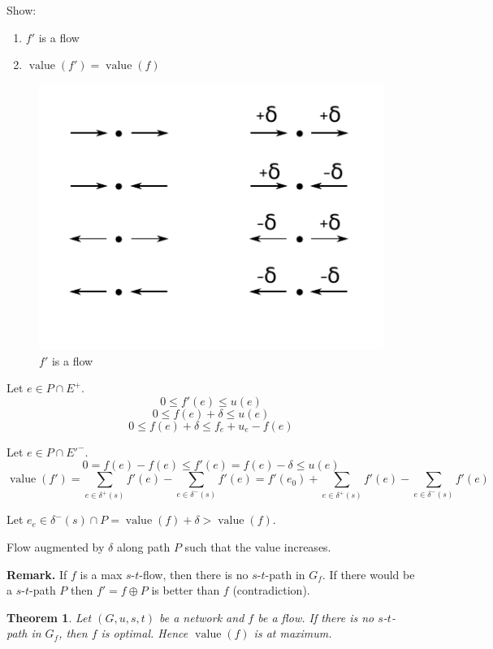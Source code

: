 \documentclass{article}
\newtheorem{theorem}{Theorem}
\newcommand{\gath}[2]{$#1$-$#2$-path} %
\newcommand{\flow}[2]{$#1$-$#2$-flow}
\begin{document}
Show:
\begin{enumerate}
  \item $f'$ is a flow
  \item $\operatorname{value}(f') = \operatorname{value}(f)$
\end{enumerate}

\begin{figure}[ht]
 \begin{center}
  \includegraphics{img/f_is_a_flow.pdf}
  \caption{$f'$ is a flow}
 \end{center}
\end{figure}

Let $e \in P \cap E^+$.
\[
  0 \leq f'(e) \leq u(e)
\] \[
  0 \leq f(e) + \delta \leq u(e)
\] \[
  0 \leq f(e) + \delta \leq f_e + u_e - f(e)
\]

Let $e \in P \cap E'^-$.
\[
  0 = f(e) - f(e) \leq f'(e) = f(e) - \delta \leq u(e)
\] \[
  \operatorname{value}(f')
    = \sum_{e \in \delta^+(s)} f'(e) - \sum_{e \in \delta^-(s)} f'(e)
    = f'(e_0) + \sum_{e \in \delta^+(s)} f'(e) - \sum_{e \in \delta^-(s)} f'(e)
\]

Let $e_e \in \delta^-(s) \cap P = \operatorname{value}(f) + \delta > \operatorname{value}(f)$.

\begin{center}
  Flow augmented by $\delta$ along path $P$ such that the value increases.
\end{center}

\textbf{Remark.}
  If $f$ is a max \flow st, then there is no \gath st in $G_f$.
  If there would be a \gath st $P$ then $f' = f \oplus P$ is better than $f$ (contradiction).

\begin{theorem}\label{lemma-4.3}
  Let $(G, u, s, t)$ be a network and $f$ be a flow. If there is no \gath st in $G_f$,
  then $f$ is optimal. Hence $\operatorname{value}(f)$ is at maximum.
\end{theorem}
\end{document}
